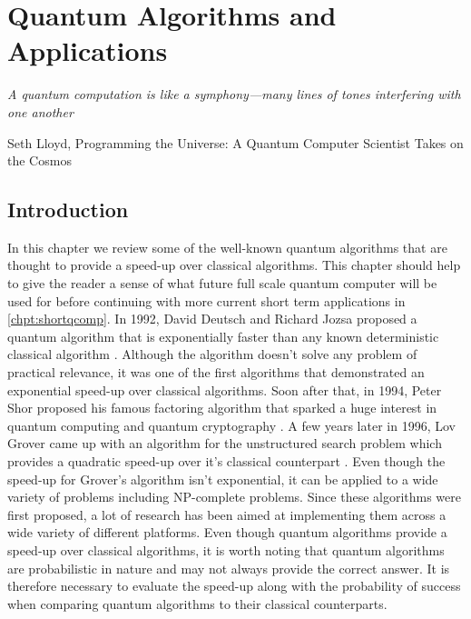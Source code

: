 \chapter{Quantum Algorithms and Applications}
\label{chpt:algorithmsandapplications}

\epigraph{\textit{A quantum computation is like a symphony—many lines of tones interfering with one another}}{Seth Lloyd, Programming the Universe: A Quantum Computer Scientist Takes on the Cosmos}


\section{Introduction}\label{sec:algorithmsIntro}

In this chapter we review some of the well-known quantum algorithms that are thought to provide a speed-up over classical algorithms. This chapter should help to give the reader a sense of what future full scale quantum computer will be used for before continuing with more current short term applications in \autoref{chpt:shortqcomp}. In 1992, David Deutsch and Richard Jozsa proposed a quantum algorithm that is exponentially faster than any known deterministic classical algorithm \cite{deutsch1992}. Although the algorithm doesn't solve any problem of practical relevance, it was one of the first algorithms that demonstrated an exponential speed-up over classical algorithms. Soon after that, in 1994, Peter Shor proposed his famous factoring algorithm that sparked a huge interest in quantum computing and quantum cryptography \cite{shor1994}. A few years later in 1996, Lov Grover came up with an algorithm for the unstructured search problem which provides a quadratic speed-up over it's classical counterpart \cite{Grover1996}. Even though the speed-up for Grover's algorithm isn't exponential, it can be applied to a wide variety of problems including NP-complete problems. Since these algorithms were first proposed, a lot of research has been aimed at implementing them across a wide variety of different platforms. Even though quantum algorithms provide a speed-up over classical algorithms, it is worth noting that quantum algorithms are probabilistic in nature and may not always provide the correct answer. It is therefore necessary to evaluate the speed-up along with the probability of success when comparing quantum algorithms to their classical counterparts.


